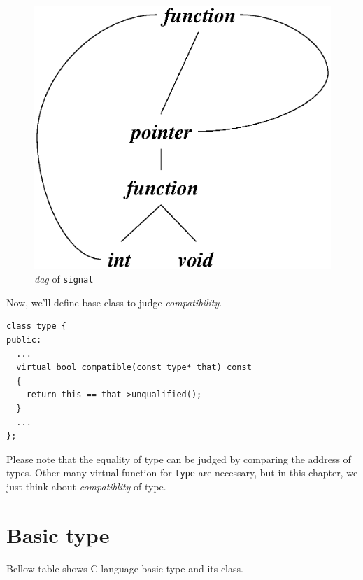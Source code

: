 \hspace{0.5cm}
\begin{figure}[htbp]
\begin{center}
\includegraphics[width=0.5\linewidth,height=0.5\linewidth]{dag.eps}
\caption{{\em dag} of {\tt{signal}}}
\label{type_e000}
\end{center}
\end{figure}

Now, we'll define base class to judge {\it compatibility}.
\begin{verbatim}
class type {
public:
  ...
  virtual bool compatible(const type* that) const
  {
    return this == that->unqualified();
  }
  ...
};
\end{verbatim}
Please note that the equality of type can be judged by
comparing the address of types.
Other many virtual function for {\tt{type}} are necessary,
but in this chapter, we just think about {\it compatiblity} of type.

\section{Basic type}

Bellow table shows C language basic type and its class.

\vspace{0.5cm}

